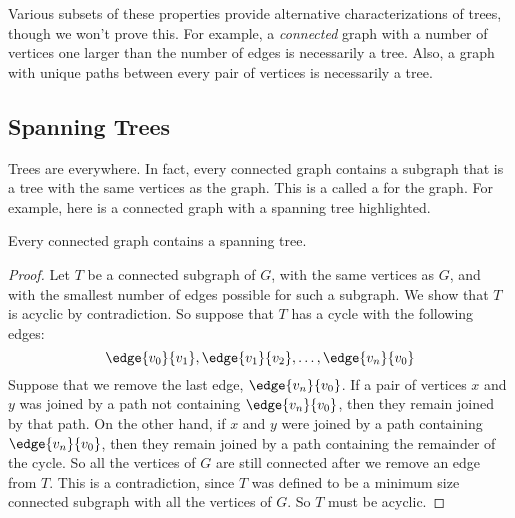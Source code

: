 Various subsets of these properties provide alternative characterizations
of trees, though we won't prove this.  For example, a \emph{connected}
graph with a number of vertices one larger than the number of edges is
necessarily a tree.  Also, a graph with unique paths between every pair of
vertices is necessarily a tree.

\subsection{Spanning Trees}
Trees are everywhere.  In fact, every connected graph contains a
subgraph that is a tree with the same vertices as the graph.  This is a
called a  for the graph.  For example, here is a
connected graph with a spanning tree highlighted.

\begin{theorem}
Every connected graph contains a spanning tree.
\end{theorem}

\begin{proof}
Let $T$ be a connected subgraph of $G$, with the same vertices as $G$, and
with the smallest number of edges possible for such a subgraph.  We show
that $T$ is acyclic by contradiction.  So suppose that $T$ has a cycle
with the following edges:
\[
\edge{v_0}{v_1}, \edge{v_1}{v_2}, \dots, \edge{v_n}{v_0}
\]
Suppose that we remove the last edge, $\edge{v_n}{v_0}$.  If a pair of
vertices $x$ and $y$ was joined by a path not containing
$\edge{v_n}{v_0}$, then they remain joined by that path.  On the other
hand, if $x$ and $y$ were joined by a path containing $\edge{v_n}{v_0}$,
then they remain joined by a path containing the remainder of the cycle.
So all the vertices of $G$ are still connected after we remove an edge
from $T$.  This is a contradiction, since $T$ was defined to be a minimum
size connected subgraph with all the vertices of $G$.  So $T$ must be
acyclic.
\end{proof}


